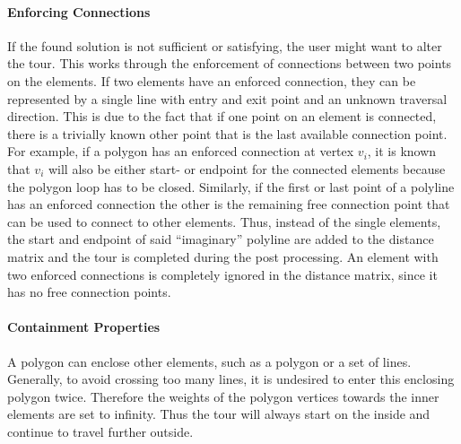 \paragraph{Enforcing Connections} If the found solution is not sufficient or satisfying, the user might want to alter the tour. This works through the enforcement of connections between two points on the elements. If two elements have an enforced connection, they can be represented by a single line with entry and exit point and an unknown traversal direction. This is due to the fact that if one point on an element is connected, there is a trivially known other point that is the last available connection point. For example, if a polygon has an enforced connection at vertex $v_i$, it is known that $v_i$ will also be either start- or endpoint for the connected elements because the polygon loop has to be closed. Similarly, if the first or last point of a polyline has an enforced connection the other is the remaining free connection point that can be used to connect to other elements. Thus, instead of the single elements, the start and endpoint of said \enquote{imaginary} polyline are added to the distance matrix and the tour is completed during the post processing. An element with two enforced connections is completely ignored in the distance matrix, since it has no free connection points.

\paragraph{Containment Properties}\label{sec:cont}

A polygon can enclose other elements, such as a polygon or a set of lines. Generally, to avoid crossing too many lines, it is undesired to enter this enclosing polygon twice. Therefore the weights of the polygon vertices towards the inner elements are set to infinity. Thus the tour will always start on the inside and continue to travel further outside.

